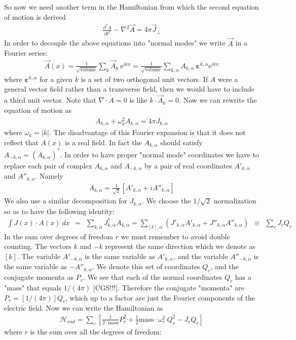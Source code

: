 \documentclass[onecolumn,fleqn, 11pt]{revtex4}
\newcommand{\eexp}{\mathrm{e}^}
\newcommand{\beq}{\begin{eqnarray}}
\newcommand{\eeq}{\end{eqnarray}}
\begin{document}
So now we need another term in the Hamiltonian 
from which the second equation of motion is derived  
\beq
\frac{\partial^{2} A}{\partial t^{2}} 
-\nabla^{2}\vec{A}
= 4\pi \vec{J}_{\perp}
\eeq
In order to decouple the above equations into "normal modes" 
we write $\vec{A}$ in a Fourier series: 
\beq
\vec{A}(x) 
= \frac{1}{\sqrt{\mbox{volume}}} \sum_{k} \vec{A}_{k} \ \eexp{ikx} 
= \frac{1}{\sqrt{\mbox{volume}}} \sum_{k,\alpha} A_{k,\alpha}
\ \bm{\varepsilon}^{k,\alpha} \eexp{ikx} 
\eeq
where $\bm{\varepsilon}^{k,\alpha}$ for a given $k$ is a set 
of two orthogonal unit vectors. If $A$ were a general vector field 
rather than a transverse field, then we would have to include 
a third unit vector. Note that $\nabla \cdot A=0$  
is like  $ k \cdot \vec{A}_k =0$. Now we can rewrite 
the equation of motion as 
\beq
\ddot{A}_{k,\alpha} + \omega_k^2 A_{k,\alpha} = 4\pi J_{k,\alpha}
\eeq
where $\omega_k=|k|$.
The disadvantage of this Fourier expansion is that 
it does not reflect that $A(x)$ is a real field. 
In fact the $A_{k,\alpha}$ should satisfy 
$A_{-k,\alpha}=(A_{k,\alpha})^*$. In order to 
have proper "normal mode" coordinates we have 
to replace each pair of complex 
$A_{k,\alpha}$ and $A_{-k,\alpha}$ by 
a pair of real coordinates  
$A'_{k,\alpha}$ and $A''_{k,\alpha}$. Namely
\beq
A_{k,\alpha}  = \frac{1}{\sqrt{2}} [A'_{k,\alpha} + i A''_{k,\alpha}] 
\eeq
We also use a similar decomposition for $J_{k,\alpha}$. 
We choose the $1/\sqrt{2}$ normalization so as to have 
the following identity:
\beq
\int J(x) \cdot A(x) \ dx \ \ = \ \ 
\sum_{k,\alpha} J_{k,\alpha}^{*} A_{k,\alpha} = 
\sum_{[k],\alpha} 
(J'_{k,\alpha} A'_{k,\alpha} + J''_{k,\alpha} A''_{k,\alpha})
\ \ \equiv \ \ \sum_r J_r Q_r
\eeq
In the sum over degrees of freedom $r$ 
we must remember to avoid double counting. 
The vectors $k$ and $-k$ represent the 
same direction which we denote as $[k]$. 
The variable $A'_{-k,\alpha}$ 
is the same variable as $A'_{k,\alpha}$, 
and the variable $A''_{-k,\alpha}$ 
is the same variable as $-A''_{k,\alpha}$. 
We denote this set of coordinates $Q_r$, 
and the conjugate momenta as $P_r$.  
We see that each of the normal coordinates 
$Q_r$ has a "mass" that equals $1/(4\pi)$ [CGS!!!]. 
Therefore the conjugate "momenta" are
$P_r=[1/(4\pi)]\dot{Q}_r$, which up to a factor 
are just the Fourier components of the electric field. 
Now we can write the Hamiltonian as 
\beq
\mathcal{H}_{rad} = 
\sum_{r} \left[
\frac{1}{2\cdot\mbox{mass}} P_r^2 
+ \frac{1}{2}\mbox{mass}\cdot \omega_r^2 \ {Q_r^2} 
- J_r Q_r \right]
\eeq
where $r$ is the sum over all the degrees of freedom:  
\end{document}
